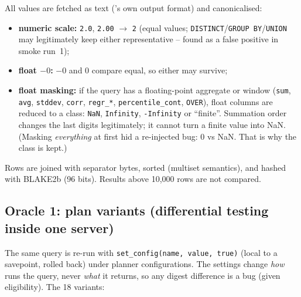 All values are fetched as text (\pg's own output format) and canonicalised:
\begin{itemize}
  \item \textbf{numeric scale:} \texttt{2.0}, \texttt{2.00} $\rightarrow$
    \texttt{2} (equal values; \texttt{DISTINCT}/\texttt{GROUP BY}/\texttt{UNION}
    may legitimately keep either representative -- found as a false positive in
    smoke run~1);
  \item \textbf{float $-0$:} $-0$ and $0$ compare equal, so either may survive;
  \item \textbf{float masking:} if the query has a floating-point aggregate or
    window (\texttt{sum}, \texttt{avg}, \texttt{stddev}, \texttt{corr},
    \texttt{regr\_*}, \texttt{percentile\_cont}, \texttt{OVER}), float columns
    are reduced to a class: \texttt{NaN}, \texttt{Infinity},
    \texttt{-Infinity} or ``finite''. Summation order changes the last digits
    legitimately; it cannot turn a finite value into NaN. (Masking
    \emph{everything} at first hid a re-injected bug: 0 vs NaN. That is why
    the class is kept.)
\end{itemize}
Rows are joined with separator bytes, sorted (multiset semantics), and hashed
with BLAKE2b (96 bits). Results above 10{,}000 rows are not compared.

\subsection{Oracle 1: plan variants (differential testing inside one server)}
\label{sec:variants}

The same query is re-run with \texttt{set\_config(name, value, true)} (local to
a savepoint, rolled back) under planner configurations. The settings change
\emph{how} \pg runs the query, never \emph{what} it returns, so any digest
difference is a bug (given eligibility). The 18 variants:

